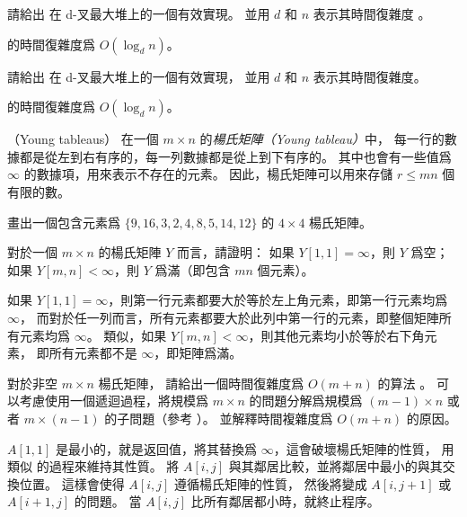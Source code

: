 \startitem
請給出  在 d-叉最大堆上的一個有效實現。
並用 $d$ 和 $n$ 表示其時間復雜度
\stopitem。

\startANSWER
{} 的時間復雜度爲 $O(\log_d{n})$。
\stopANSWER

\startitem
請給出  在 d-叉最大堆上的一個有效實現，
並用 $d$ 和 $n$ 表示其時間復雜度。
\stopitem

\startANSWER
{} 的時間復雜度爲 $O(\log_d{n})$。
\stopANSWER
\stopigBase
\stopPROBLEM

\startPROBLEM
（Young tableaus）
在一個 $m\times n$ 的\emph{楊氏矩陣（Young tableau）}中，
每一行的數據都是從左到右有序的，每一列數據都是從上到下有序的。
其中也會有一些值爲 $\infty$ 的數據項，用來表示不存在的元素。
因此，楊氏矩陣可以用來存儲 $r\le mn$ 個有限的數。


\startigBase[a]\startitem
畫出一個包含元素爲 $\{9, 16, 3, 2, 4, 8, 5, 14, 12\}$ 的 $4\times 4$ 楊氏矩陣。
\stopitem\stopigBase

\startANSWER
\startformula\startpmatrix%
    \NR
{}   \NC \infty \NR
{}  \NC \infty \NC \infty \NR
\NC \infty \NC \infty \NC \infty \NC \infty \NR
\stoppmatrix\stopformula
\stopANSWER

\startigBase[continue]\startitem
對於一個 $m\times n$ 的楊氏矩陣 $Y$ 而言，請證明：
如果 $Y[1,1]=\infty$，則 $Y$ 爲空；
如果 $Y[m,n]<\infty$，則 $Y$ 爲滿（即包含 $mn$ 個元素）。
\stopitem\stopigBase

\startANSWER
如果 $Y[1,1]=\infty$，則第一行元素都要大於等於左上角元素，即第一行元素均爲 $\infty$，
而對於任一列而言，所有元素都要大於此列中第一行的元素，即整個矩陣所有元素均爲 $\infty$。
類似，如果 $Y[m,n]<\infty$，則其他元素均小於等於右下角元素，
即所有元素都不是 $\infty$，即矩陣爲滿。
\stopANSWER

\startigBase[continue]\startitem
對於非空 $m\times n$ 楊氏矩陣，
請給出一個時間復雜度爲 $O(m+n)$ 的算法 。
可以考慮使用一個遞迴過程，將規模爲 $m\times n$ 的問題分解爲規模爲 $(m-1)\times n$ 或
者 $m\times(n-1)$ 的子問題（\hint 參考 ）。
並解釋時間複雜度爲 $O(m+n)$ 的原因。
\stopitem\stopigBase

\startANSWER
$A[1,1]$ 是最小的，就是返回值，將其替換爲 $\infty$，這會破壞楊氏矩陣的性質，
用類似  的過程來維持其性質。
將 $A[i,j]$ 與其鄰居比較，並將鄰居中最小的與其交換位置。
這樣會使得 $A[i,j]$ 遵循楊氏矩陣的性質，
然後將變成 $A[i,j+1]$ 或 $A[i+1,j]$ 的問題。
當 $A[i,j]$ 比所有鄰居都小時，就終止程序。
\stopANSWER

